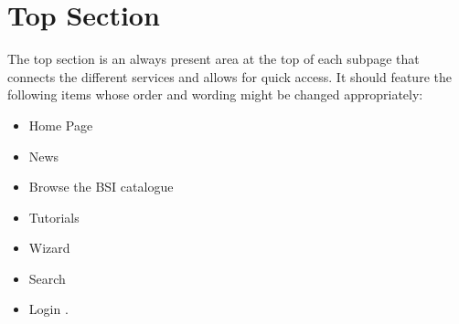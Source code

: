\section{Top Section}  
\label{top_section}

The top section is an always present area at the top of each subpage that connects the different services and allows for quick access.
It should feature the following items whose order and wording might be changed appropriately:
\begin{itemize}
    \item Home Page
    \item News
    \item Browse the BSI catalogue
    \item Tutorials
    \item Wizard
    \item Search
    \item Login  
        . 
\end{itemize}



